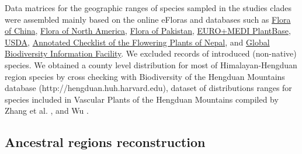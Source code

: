 \documentclass[10pt]{article}
\begin{document}
Data matrices for the geographic ranges of species sampled in the
studies clades were assembled mainly based on the online eFloras and
databases such as
\href{http://www.efloras.org/flora_page.aspx?flora_id=2}{Flora of
  China}, \href{http://floranorthamerica.org}{Flora of North America},
\href{http://www.efloras.org/flora_page.aspx?flora_id=5}{Flora of
  Pakistan}, \href{http://www.emplantbase.org}{EURO+MEDI PlantBase},
\href{http://plants.usda.gov}{USDA},
\href{http://www.efloras.org/flora_page.aspx?flora_id=110}{Annotated
  Checklist of the Flowering Plants of Nepal}, and
\href{http://www.gbif.org}{Global Biodiversity Information
  Facility}. We excluded records of introduced (non-native)
species. We obtained a county level distribution for most of
Himalayan-Hengduan region species by cross checking with Biodiversity
of the Hengduan Mountains database (http://hengduan.huh.harvard.edu),
dataset of distributions ranges for species included in Vascular
Plants of the Hengduan Mountains compiled by Zhang et
al. \citep{Zhang2009}, and Wu \citep{Wu2008}.

\subsection*{Ancestral regions reconstruction}




\end{document}
